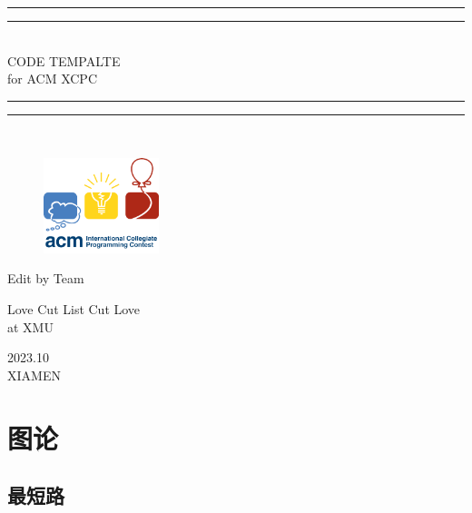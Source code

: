 \documentclass[a4paper,11pt,twoside,fontset = fandol,UTF8]{ctexbook}
\newcommand{\emptyPage}{\null\thispagestyle{empty}\addtocounter{page}{-1}\newpage}
\begin{document}
  \begin{titlepage}       %
    \centering
    \vspace*{\baselineskip}
    \rule{\textwidth}{1.6pt}
    \vspace*{-\baselineskip}
    \vspace*{2pt}
    \rule{\textwidth}{0.4pt}\\[\baselineskip]{\LARGE CODE TEMPALTE\\[\baselineskip]\small for ACM XCPC}
    \\[0.2\baselineskip]
    \rule{\textwidth}{0.4pt}\vspace*{-\baselineskip}\vspace{3.2pt}
    \rule{\textwidth}{1.6pt}\\[\baselineskip]
    \scshape

    \begin{figure}[!htb]
        \centering
        \includegraphics[width=0.3\textwidth]{icpc}    %
    \end{figure}

    \vspace*{3\baselineskip}
    Edit by Team\\
    [\baselineskip]
    {\Large {}  \par}
    {\Large Love Cut List Cut Love \\ \normalsize{at XMU}\par}
    \vfill
    {\scshape 2023.10}\\{\large XIAMEN}\par
  \end{titlepage}

  \emptyPage

  \setcounter{page}{1}
  \tableofcontents


  \newpage
  \emptyPage

  \setcounter{page}{1}

  \chapter{图论}
  \setcounter{page}{1}
  \section{最短路}
\end{document}
